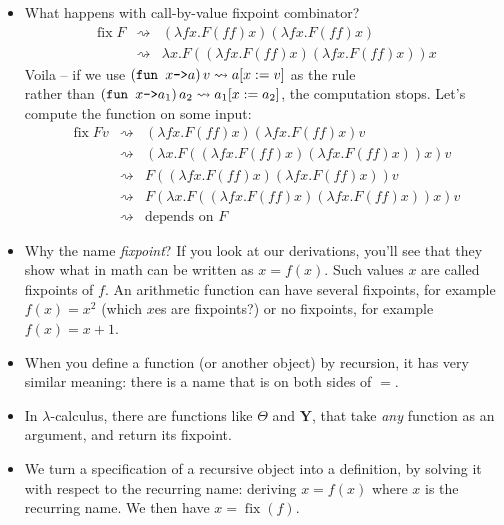 \documentclass{beamer}
\newcommand{\assign}{:=}
\newcommand{\tmem}[1]{{\em #1\/}}
\newcommand{\tmmathbf}[1]{\ensuremath{\boldsymbol{#1}}}
\newcommand{\tmop}[1]{\ensuremath{\operatorname{#1}}}
\newcommand{\tmverbatim}[1]{\text{{\ttfamily{#1}}}}
\begin{document}
\begin{itemize}
  \item What happens with call-by-value fixpoint combinator?
  \begin{eqnarray*}
    \tmop{fix} F & \rightsquigarrow & (\lambda f x.F (f f) x)  (\lambda f x.F
    (f f) x)\\
    & \rightsquigarrow & \lambda x.F ((\lambda f x.F (f f) x)  (\lambda f x.F
    (f f) x)) x
  \end{eqnarray*}
  Voila -- if we use $\left( \text{\tmverbatim{fun }} x \text{\tmverbatim{->}}
  a \right) v \rightsquigarrow a [x \assign v]$ as the rule\\
  rather than $\left( \text{\tmverbatim{fun }} x \text{\tmverbatim{->}} a_1
  \right) a_2 \rightsquigarrow a_1 [x \assign a_2]$, the computation stops.
  Let's compute the function on some input:
  \begin{eqnarray*}
    \tmop{fix} F v & \rightsquigarrow & (\lambda f x.F (f f) x)  (\lambda f
    x.F (f f) x) v\\
    & \rightsquigarrow & (\lambda x.F ((\lambda f x.F (f f) x)  (\lambda f
    x.F (f f) x)) x) v\\
    & \rightsquigarrow & F ((\lambda f x.F (f f) x)  (\lambda f x.F (f f) x))
    v\\
    & \rightsquigarrow & F (\lambda x.F ((\lambda f x.F (f f) x)  (\lambda f
    x.F (f f) x)) x) v\\
    & \rightsquigarrow & \text{depends on } F
  \end{eqnarray*}
  \item Why the name {\tmem{fixpoint}}? If you look at our derivations, you'll
  see that they show what in math can be written as $x = f (x)$. Such values
  $x$ are called fixpoints of $f$. An arithmetic function can have several
  fixpoints, for example $f (x) = x^2$ (which $x$es are fixpoints?) or no
  fixpoints, for example $f (x) = x + 1$.
  
  \item When you define a function (or another object) by recursion, it has
  very similar meaning: there is a name that is on both sides of $=$.
  
  \item In $\lambda$-calculus, there are functions like $\Theta$ and
  $\tmmathbf{Y}$, that take {\tmem{any}} function as an argument, and return
  its fixpoint.
  
  \item We turn a specification of a recursive object into a definition, by
  solving it with respect to the recurring name: deriving $x = f (x)$ where
  $x$ is the recurring name. We then have $x = \tmop{fix} (f)$.
  

\end{itemize}
\end{document}
